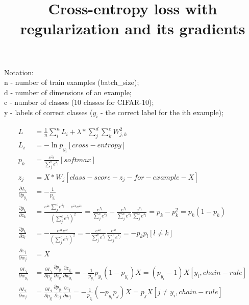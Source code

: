 \documentclass{article}
\title{Cross-entropy loss with regularization and its gradients}
\author{}
\date{\vspace{-5ex}}
\begin{document}
  \maketitle
  
  Notation:\\
  n - number of train examples (batch\_size);\\
  d - number of dimensions of an example;\\
  c - number of classes (10 classes for CIFAR-10);\\
  y - labels of correct classes ($y_{i}$ - the correct label for the ith example);

  \begin{align*}
  L &= \frac{1}{n} \sum_{i}^{n} L_{i} 
       + \lambda * \sum_{j}^{d} \sum_{k}^{c} W_{j,k}^{2}\\
  L_{i} &= -\ln{p_{y_{i}}} [cross-entropy]\\
  p_{k} &= \frac {e^{z_{k}}}{\sum_{j}^{c} e^{z_{j}}} [softmax]\\
  z_{j} &= X * W_{j} [class-score-z_{j}-for-example-X]\\
  \frac {\partial L_{i}}{\partial p_{y_{i}}} &= -\frac {1}{p_{y_{i}}}\\
  \frac {\partial p_{k}}{\partial z_{k}} &= 
        \frac {e^{z_{k}}\sum_{j}^{c} e^{z_{j}} - e^{z_{k}}e^{z_{k}}}
              {(\sum_{j}^{c} e^{z_{j}})^2} 
      = \frac {e^{z_{k}}}{\sum_{j}^{c} e^{z_{j}}}
        -
        \frac {e^{z_{k}}}{\sum_{j}^{c} e^{z_{j}}}
        \frac {e^{z_{k}}}{\sum_{j}^{c} e^{z_{j}}}
      = p_{k} - p_{k}^2
      = p_{k}(1 - p_{k})\\
  \frac {\partial p_{k}}{\partial z_{l}} &= 
        -\frac {e^{z_{k}}e^{z_{l}}}
               {(\sum_{j}^{c} e^{z_{j}})^2}
       = -\frac {e^{z_{k}}}{\sum_{j}^{c} e^{z_{j}}}
          \frac {e^{z_{l}}}{\sum_{j}^{c} e^{z_{j}}} 
       = -p_{k}p_{l} [l \neq k]\\
  \frac {\partial z_{j}}{\partial w_{j}} &= X\\
  \frac {\partial L_{i}}{\partial w_{y_{i}}} &=
         \frac {\partial L_{i}}{\partial p_{y_{i}}}
         \frac {\partial p_{y_{i}}}{\partial z_{y_{i}}}
         \frac {\partial z_{y_{i}}}{\partial w_{y_{i}}}
      = -\frac {1}{p_{y_{i}}}{p_{y_{i}}}(1 - p_{y_{i}})X
      = (p_{y_{i}} - 1)X [y_{i}, chain- rule]\\
  \frac {\partial L_{i}}{\partial w_{j}} &=
         \frac {\partial L_{i}}{\partial p_{y_{i}}}
         \frac {\partial p_{y_{i}}}{\partial z_{j}}
         \frac {\partial z_{j}}{\partial w_{j}}
      = -\frac {1}{p_{y_{i}}}(-p_{y_{i}}p_{j})X
      = p_{j}X [j \neq y_{i}, chain- rule]
  \end{align*}
\end{document}
